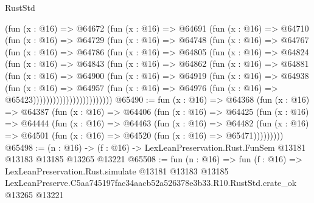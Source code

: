 \begin{lexlean}{RustStd}
\begin{coremodule}
                (fun (x : @16) =>
                @64672
                  (fun (x : @16) =>
                  @64691
                    (fun (x : @16) =>
                    @64710
                      (fun (x : @16) =>
                      @64729
                        (fun (x : @16) =>
                        @64748
                          (fun (x : @16) =>
                          @64767
                            (fun (x : @16) =>
                            @64786
                              (fun (x : @16) =>
                              @64805
                                (fun (x : @16) =>
                                @64824
                                  (fun (x : @16) =>
                                  @64843
                                    (fun (x : @16) =>
                                    @64862
                                      (fun (x : @16) =>
                                      @64881
                                        (fun (x : @16) =>
                                        @64900
                                          (fun (x : @16) =>
                                          @64919
                                            (fun (x : @16) =>
                                            @64938
                                              (fun (x : @16) =>
                                              @64957
                                                (fun (x : @16) =>
                                                @64976
                                                  (fun (x : @16) => @65423))))))))))))))))))))))))
@65490 := fun (x : @16) =>
  @64368
    (fun (x : @16) =>
    @64387
      (fun (x : @16) =>
      @64406
        (fun (x : @16) =>
        @64425
          (fun (x : @16) =>
          @64444
            (fun (x : @16) =>
            @64463
              (fun (x : @16) =>
              @64482
                (fun (x : @16) => @64501 (fun (x : @16) => @64520 (fun (x : @16) => @65471)))))))))
@65498 := (n : @16) ->
  (f : @16) -> LexLeanPreservation.Rust.FunSem @13181 @13183 @13185 @13265 @13221
@65508 := fun (n : @16) =>
  fun (f : @16) =>
  LexLeanPreservation.Rust.simulate
    @13181
    @13183
    @13185
    LexLeanPreserve.C5aa745197fac34aacb52a526378e3b33.R10.RustStd.crate_ok
    @13265
    @13221
\end{coremodule}
\end{lexlean}
